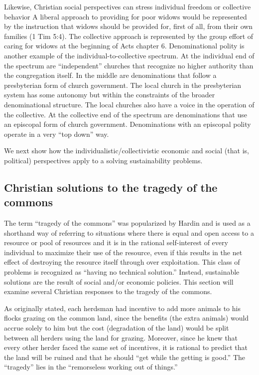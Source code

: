 \documentclass[12pt]{article}
\begin{document}
Likewise, Christian social perspectives can stress individual freedom or collective behavior
A liberal approach to providing for poor widows would be represented by the instruction that widows should be 
provided for, first of all, from their own families (1 Tim 5:4). 
The collective approach is represented by the group effort of caring for widows at the beginning of Acts chapter 6.
Denominational polity is another example of the individual-to-collective spectrum.
At the individual end of the spectrum are ``independent'' churches that recognize no higher authority than the congregation itself.
In the middle are denominations that follow a presbyterian form of church 
government. The local church in the presbyterian system has some autonomy but within the constraints of the broader 
denominational structure. The local churches also have a voice in the operation of the collective. At the collective end of the spectrum 
are denominations that use an episcopal form of church government. Denominations with an episcopal polity operate in a very ``top down'' 
way.

We next show how the individualistic/collectivistic economic and social (that is, political) perspectives apply to a solving sustainability problems.

\subsection{Christian solutions to the tragedy of the commons}
\label{sec:totc}
The term ``tragedy of the commons'' was popularized by Hardin \autocite{Hardin68} 
and is used as a shorthand way of referring to
situations where there is equal and open access to a resource or pool of resources and it is in the rational self-interest of
every individual to maximize their use of the resource, even if this results in the net effect of destroying the
resource itself through over exploitation. This class of problems is recognized as ``having no technical solution.''
Instead, sustainable solutions are the result of social and/or economic policies. This section will examine several
Christian responses to the tragedy of the commons.

As originally stated, each herdsman had incentive to add more animals to his flocks grazing on the common land, since
the benefits (the extra animals) would accrue solely to him but the cost (degradation of the land) would be split between
all herders using the land for grazing. Moreover, since he knew that every other herder faced the same set of
incentives, it is rational to predict that the land will be ruined and that he should ``get while the getting is good.''
The ``tragedy'' lies in the ``remorseless working out of things.''
\end{document}
